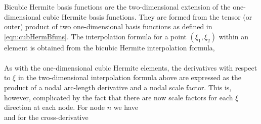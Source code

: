 Bicubic Hermite basis functions are the two-dimensional extension of the
one-dimensional cubic Hermite basis functions. They are formed from the tensor
(or outer) product of two one-dimensional basis functions as defined in
\eqref{eqn:cubHermBfuns}. The interpolation formula for a point $(\xi_{1},
\xi_{2})$ within an element is obtained from the bicubic Hermite interpolation
formula,
\begin{eqnarray}
    \label{eqn:bicubHerminterp}
\end{eqnarray}

As with the one-dimensional cubic Hermite elements, the derivatives with
respect to $\xi$ in the two-dimensional interpolation formula above are
expressed as the product of a nodal arc-length derivative and a nodal scale
factor. This is, however, complicated by the fact that there are now scale
factors for each $\xi$ direction at each node. For node $n$ we
have
\begin{equation}
  \label{eqn:xitoarclength2}
\end{equation}
and for the cross-derivative
\begin{equation}
  \label{eqn:xitoarclength3}
\end{equation}

